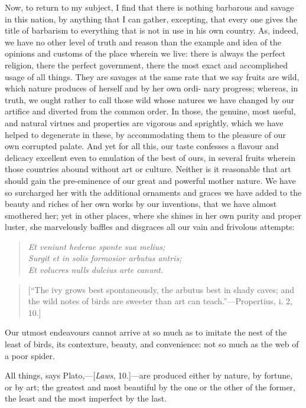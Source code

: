 \documentclass[twocolumn]{article}
\newcommand{\specialbreak}{\newpage\noindent}
\begin{document}
	Now, to return to my subject, I find that there is nothing barbarous and savage in this nation, by anything that I can gather, excepting, that every one gives the title of barbarism to everything that is not in use in his own country. As, indeed, we have no other level of truth and reason than the example and idea of the opinions and customs of the place wherein we live: there is always the perfect religion, there the perfect government, there the most exact and accomplished usage of all things. They are savages at the same rate that we say fruits are wild, which nature produces of herself and by her own ordi- \specialbreak nary progress; whereas, in truth, we ought rather to call those wild whose natures we have changed by our artifice and diverted from the common order. In those, the genuine, most useful, and natural virtues and properties are vigorous and sprightly, which we have helped to degenerate in these, by accommodating them to the pleasure of our own corrupted palate. And yet for all this, our taste confesses a flavour and delicacy excellent even to emulation of the best of ours, in several fruits wherein those countries abound without art or culture. Neither is it reasonable that art should gain the pre-eminence of our great and powerful mother nature. We have so surcharged her with the additional ornaments and graces we have added to the beauty and riches of her own works by our inventions, that we have almost smothered her; yet in other places, where she shines in her own purity and proper luster, she marvelously baffles and disgraces all our vain and frivolous attempts:

	\begin{quote}
		\noindent\emph{Et veniunt hederae sponte sua melius;}\\
		\emph{Surgit et in solis formosior arbutus antris;}\\
		\emph{Et volucres nulls dulcius arte canunt.}
	\end{quote}
	
	\begin{quote}
		[``The ivy grows best spontaneously, the arbutus best in shady caves; and the wild notes of birds are sweeter than art can teach.''---Propertius, i. 2, 10.]
	\end{quote}
	
	Our utmost endeavours cannot arrive at so much as to imitate the nest of the least of birds, its contexture, beauty, and convenience: not so much as the web of a poor spider.

	All things, says Plato,---[\emph{Laws}, 10.]---are produced either by nature, by fortune, or by art; the greatest and most beautiful by the one or the other of the former, the least and the most imperfect by the last.
\end{document}
